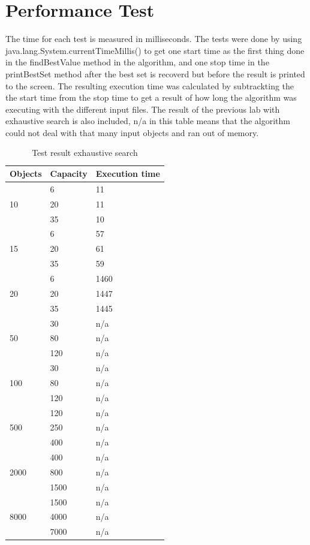 \documentclass{inc/mas}
\begin{document}
\section{Performance Test}

The time for each test is measured in milliseconds. The tests were done by using java.lang.System.currentTimeMillis() to get one start time as the first thing done in the findBestValue method in the algorithm, and one stop time in the printBestSet method after the best set is recoverd but before the result is printed to the screen. The resulting execution time was calculated by subtrackting the the start time from the stop time to get a result of how long the algorithm was executing with the different input files. The result of the previous lab with exhaustive search is also included, n/a in this table means that the algorithm could not deal with that many input objects and ran out of memory. \\

\begin{table}
\begin{center}
\caption{Test result exhaustive search}
\begin{tabular}{|l|l|l|} \hline
Objects &Capacity &Execution time\\ \hline
\multirow{3}{*}{10} & 6 & 11 \\
& 20 & 11 \\
& 35 & 10 \\ \hline
\multirow{3}{*}{15} & 6 & 57 \\
& 20 & 61 \\
& 35 & 59 \\ \hline
\multirow{3}{*}{20} & 6 & 1460 \\
& 20 & 1447 \\
& 35 & 1445 \\ \hline
\multirow{3}{*}{50} & 30 & n/a \\
& 80 & n/a \\
& 120 & n/a \\ \hline
\multirow{3}{*}{100} & 30 &  n/a\\
& 80 & n/a \\
& 120 & n/a \\ \hline
\multirow{3}{*}{500} & 120 & n/a \\
& 250 & n/a \\
& 400 & n/a \\ \hline
\multirow{3}{*}{2000} & 400 & n/a \\
& 800 & n/a \\
& 1500 & n/a \\ \hline
\multirow{3}{*}{8000} & 1500 & n/a \\
& 4000 & n/a \\
& 7000 & n/a \\ \hline
\end{tabular}
\end{center}
\end{table}
\end{document}
